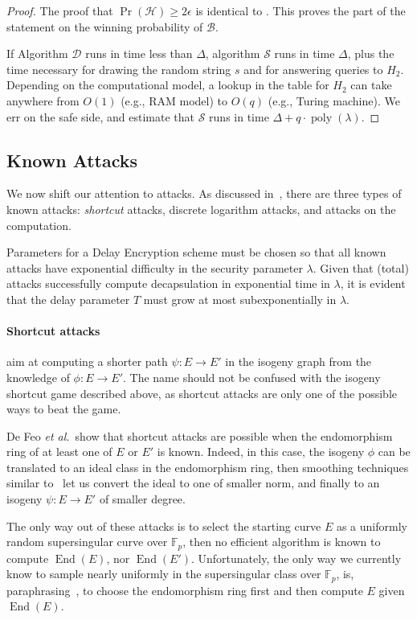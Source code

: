 \documentclass{llncs}
\newcommand{\F}{\mathbb{F}}
\DeclareMathOperator{\End}{End}
\DeclareMathOperator{\poly}{poly}
\begin{document}
\begin{proof}
  The proof that $\Pr(\mathcal{H})\ge 2\epsilon$ is identical to
  \cite[Lemma~4.3, Claim~2]{doi:10.1137/S0097539701398521}. %
  This proves the part of the statement on the winning probability of
  $\mathcal{B}$.
  
  If Algorithm $\mathcal{D}$ runs in time less than $\Delta$,
  algorithm $\mathcal{S}$ runs in time $\Delta$, plus the time
  necessary for drawing the random string $s$ and for answering
  queries to $H_2$. %
  Depending on the computational model, a lookup in the table for
  $H_2$ can take anywhere from $O(1)$ (e.g., RAM model) to $O(q)$
  (e.g., Turing machine). %
  We err on the safe side, and estimate that $\mathcal{S}$ runs in
  time $\Delta + q\cdot\poly(\lambda)$.
\end{proof}


\subsection{Known Attacks}
We now shift our attention to attacks. %
As discussed in~\cite{10.1007/978-3-030-34578-5_10}, there are three
types of known attacks: \emph{shortcut} attacks, discrete logarithm
attacks, and attacks on the computation.

Parameters for a Delay Encryption scheme must be chosen so that all
known attacks have exponential difficulty in the security parameter
$\lambda$. %
Given that (total) attacks successfully compute decapsulation in
exponential time in $\lambda$, it is evident that the delay parameter
$T$ must grow at most subexponentially in $\lambda$.

\paragraph{Shortcut attacks} aim at computing a shorter path
$\psi:E\to E'$ in the isogeny graph from the knowledge of
$\phi:E\to E'$. %
The name should not be confused with the isogeny shortcut game
described above, as shortcut attacks are only one of the possible ways
to beat the game.

De Feo \emph{et al.}\ show that shortcut attacks are possible when the
endomorphism ring of at least one of $E$ or $E'$ is known. %
Indeed, in this case, the isogeny $\phi$ can be translated to an ideal
class in the endomorphism ring, then smoothing techniques similar
to~\cite{kohel2014quaternion} let us convert the ideal to one of
smaller norm, and finally to an isogeny $\psi:E\to E'$ of smaller
degree.

The only way out of these attacks is to select the starting curve $E$
as a uniformly random supersingular curve over $\F_p$, then no
efficient algorithm is known to compute $\End(E)$, nor $\End(E')$. %
Unfortunately, the only way we currently know to sample nearly
uniformly in the supersingular class over $\F_p$, is,
paraphrasing~\cite{galbraith2018computational}, to choose the
endomorphism ring first and then compute $E$ given $\End(E)$.
\end{document}
